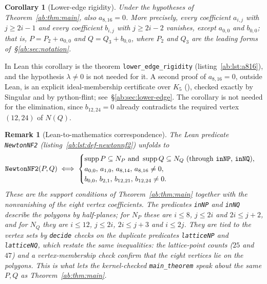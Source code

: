\documentclass[a4paper,11pt]{article}
\newcommand{\filename}[1]{\texttt{\seqsplit{#1}}}
\theoremstyle{jsplain}
\newtheorem{corollary}[theorem]{Corollary}
\theoremstyle{jsdef}
\theoremstyle{jsrem}
\newtheorem{remark}[theorem]{Remark}
\begin{document}
\begin{corollary}[Lower-edge rigidity]\label{ab:cor:a816}
Under the hypotheses of Theorem~\ref{ab:thm:main}, also $a_{8,16}=0$. More precisely, every coefficient $a_{i,j}$ with $j\geq 2i-1$ and every coefficient $b_{i,j}$ with $j\geq 2i-2$ vanishes, except $a_{0,0}$ and $b_{0,0}$; that is, $P=P_2+a_{0,0}$ and $Q=Q_3+b_{0,0}$, where $P_2$ and $Q_3$ are the leading forms of~\S\ref{ab:sec:notation}.
\end{corollary}

In Lean this corollary is the theorem \texttt{lower\_\allowbreak{}edge\_\allowbreak{}rigidity} (listing~\ref{ab:lst:a816}), and the hypothesis $\lambda\neq0$ is not needed for it. A second proof of $a_{8,16}=0$, outside Lean, is an explicit ideal-membership certificate over $K_5$ (\filename{scripts/a816\_certificate/}), checked exactly by {\sc Singular} and by python-flint; see~\S\ref{ab:sec:lower-edge}. The corollary is not needed for the elimination, since $b_{12,24}=0$ already contradicts the required vertex $(12,24)$ of $N(Q)$.

\begin{remark}[Lean-to-mathematics correspondence]\label{ab:rem:nf2-bridge}
The Lean predicate \texttt{NewtonNF2} (listing~\ref{ab:lst:def-newtonnf2}) unfolds to
\[
\texttt{NewtonNF2}(P,Q)\iff
\begin{cases}
\operatorname{supp}P\subseteq N_P\ \text{and}\ \operatorname{supp}Q\subseteq N_Q
\ \text{(through \texttt{inNP}, \texttt{inNQ})},\\
a_{0,0},\,a_{1,0},\,a_{8,14},\,a_{8,16}\neq0,\\
b_{0,0},\,b_{2,1},\,b_{12,21},\,b_{12,24}\neq0 .
\end{cases}
\]
These are the support conditions of Theorem~\ref{ab:thm:main} together with the nonvanishing of the eight vertex coefficients. The predicates \texttt{inNP} and \texttt{inNQ} describe the polygons by half-planes; for $N_P$ these are $i\le 8$, $j\le 2i$ and $2i\le j+2$, and for $N_Q$ they are $i\le 12$, $j\le 2i$, $2i\le j+3$ and $i\le 2j$. They are tied to the vertex sets by \texttt{decide} checks on the duplicate predicates \texttt{latticeNP} and \texttt{latticeNQ}, which restate the same inequalities: the lattice-point counts ($25$ and $47$) and a vertex-membership check confirm that the eight vertices lie on the polygons. This is what lets the kernel-checked \texttt{main\_\allowbreak{}theorem} speak about the same $P,Q$ as Theorem~\ref{ab:thm:main}.
\end{remark}
\end{document}
